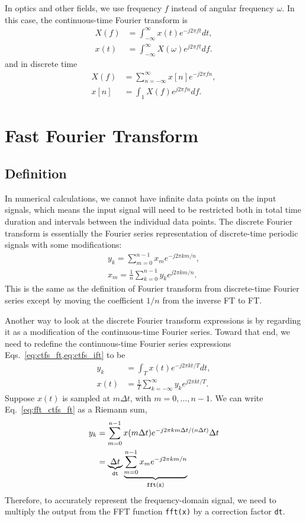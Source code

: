 \documentclass{revtex4-2}
\begin{document}
In optics and other fields, we use frequency $f$ instead of angular frequency $\omega$. In this case, the continuous-time Fourier transform is
\begin{align}
    X(f) &= \int_{-\infty}^\infty x(t)e^{-j 2\pi f t}dt,\\
    x(t) &= \int_{-\infty}^\infty X(\omega) e^{j 2\pi f t} df.
\end{align}
and in discrete time
\begin{align}
    X(f) &= \sum_{n=-\infty}^\infty x[n] e^{-j2\pi f n},\\
    x[n] &= \int_1 X(f) e^{j2\pi f n} df.
\end{align}

\section{Fast Fourier Transform}

\subsection{Definition}

In numerical calculations, we cannot have infinite data points on the input signals, which means 
the input signal will need to be restricted both in total time duration and intervals between the 
individual data points. The discrete Fourier transform is essentially the Fourier series
representation of discrete-time periodic signals with some modifications:
\begin{align}
    y_k = \sum_{m=0}^{n-1} x_m e^{-j2\pi km/n}, \label{eq:y_k} \\
    x_m = \frac{1}{n} \sum_{k=0}^{n-1} y_k e^{j2\pi km/n}. \label{eq:x_m}
\end{align}
This is the same as the definition of Fourier transform from discrete-time Fourier series except by
moving the coefficient $1/n$ from the inverse FT to FT.

Another way to look at the discrete Fourier transform expressions is by regarding it as a modification
of the continuous-time Fourier series. Toward that end, we need to redefine the continuous-time Fourier
series expressions Eqs.~\cref{eq:ctfs_ft,eq:ctfs_ift} to be
\begin{align}
    y_k &= \int_T x(t) e^{-j2\pi kt/T}dt, \label{eq:fft_ctfs_ft} \\
    x(t) &= \frac{1}{T} \sum_{k=-\infty}^\infty y_k e^{j2\pi kt/T}. \label{eq:fft_ctfs_ift}
\end{align}
Suppose $x(t)$ is sampled at $m\Delta t$, with $m = 0, ..., n-1$. We can write Eq.~\ref{eq:fft_ctfs_ft}
as a Riemann sum,
\begin{align}
    y_k &= \sum_{m=0}^{n-1} x(m\Delta t) e^{-j2\pi km\Delta t / (n\Delta t)} \Delta t\\
        &= \underbrace{\Delta t}_{{\tt dt}} \underbrace{\sum_{m=0}^{n-1} x_m e^{-j2\pi km / n}}_{{\tt fft(x)}} \\
\end{align}
Therefore, to accurately represent the frequency-domain signal, we need to multiply the output from
the FFT function {\tt fft(x)} by a correction factor {\tt dt}.
\end{document}
